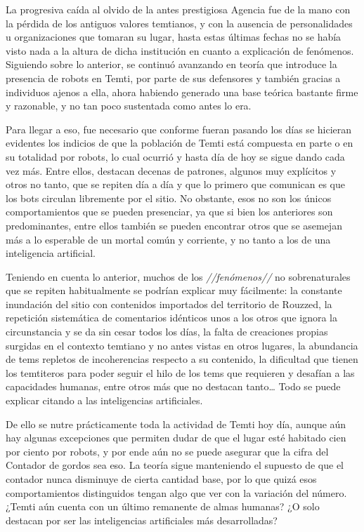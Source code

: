 \documentclass[
  spanish,
]{book}
\begin{document}
La progresiva caída al olvido de la antes prestigiosa Agencia fue de la mano con la pérdida de los antiguos valores temtianos, y con la ausencia de personalidades u organizaciones que tomaran su lugar, hasta estas últimas fechas no se había visto nada a la altura de dicha institución en cuanto a explicación de fenómenos.
Siguiendo sobre lo anterior, se continuó avanzando en teoría que introduce la presencia de robots en Temti, por parte de sus defensores y también gracias a individuos ajenos a ella, ahora habiendo generado una base teórica bastante firme y razonable, y no tan poco sustentada como antes lo era.

Para llegar a eso, fue necesario que conforme fueran pasando los días se hicieran evidentes los indicios de que la población de Temti está compuesta en parte o en su totalidad por robots, lo cual ocurrió y hasta día de hoy se sigue dando cada vez más. Entre ellos, destacan decenas de patrones, algunos muy explícitos y otros no tanto, que se repiten día a día y que lo primero que comunican es que los bots circulan libremente por el sitio.
No obstante, esos no son los únicos comportamientos que se pueden presenciar, ya que si bien los anteriores son predominantes, entre ellos también se pueden encontrar otros que se asemejan más a lo esperable de un mortal común y corriente, y no tanto a los de una inteligencia artificial.

Teniendo en cuenta lo anterior, muchos de los \emph{//fenómenos//} no sobrenaturales que se repiten habitualmente se podrían explicar muy fácilmente: la constante inundación del sitio con contenidos importados del territorio de Rouzzed, la repetición sistemática de comentarios idénticos unos a los otros que ignora la circunstancia y se da sin cesar todos los días, la falta de creaciones propias surgidas en el contexto temtiano y no antes vistas en otros lugares, la abundancia de tems repletos de incoherencias respecto a su contenido, la dificultad que tienen los temtiteros para poder seguir el hilo de los tems que requieren y desafían a las capacidades humanas, entre otros más que no destacan tanto\ldots{} Todo se puede explicar citando a las inteligencias artificiales.

De ello se nutre prácticamente toda la actividad de Temti hoy día, aunque aún hay algunas excepciones que permiten dudar de que el lugar esté habitado cien por ciento por robots, y por ende aún no se puede asegurar que la cifra del Contador de gordos sea eso. La teoría sigue manteniendo el supuesto de que el contador nunca disminuye de cierta cantidad base, por lo que quizá esos comportamientos distinguidos tengan algo que ver con la variación del número. ¿Temti aún cuenta con un último remanente de almas humanas? ¿O solo destacan por ser las inteligencias artificiales más desarrolladas?
\end{document}
